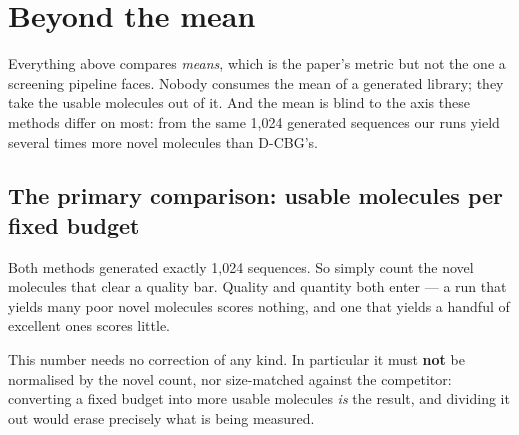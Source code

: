 \documentclass[11pt]{article}
\begin{document}
\begin{table}[htbp]
\centering
\small
{}
\caption{UDLM: the Pareto-optimal settings of each method on (novel count, novel-ring count).}
\label{tab:frontier-ring_count-UDLM}
\end{table}

\section{Beyond the mean}\label{sec:beyond-mean-ring_count}

Everything above compares \emph{means}, which is the paper's metric but not the
one a screening pipeline faces. Nobody consumes the mean of a generated library;
they take the usable molecules out of it. And the mean is blind to the axis these
methods differ on most: from the same 1{,}024 generated sequences our runs yield
several times more novel molecules than D-CBG's.

\subsection{The primary comparison: usable molecules per fixed budget}

Both methods generated exactly 1{,}024 sequences. So simply count the novel
molecules that clear a quality bar. Quality and quantity both enter --- a run
that yields many poor novel molecules scores nothing, and one that yields a
handful of excellent ones scores little.

This number needs no correction of any kind. In particular it must \textbf{not}
be normalised by the novel count, nor size-matched against the competitor:
converting a fixed budget into more usable molecules \emph{is} the result, and
dividing it out would erase precisely what is being measured.
\end{document}
